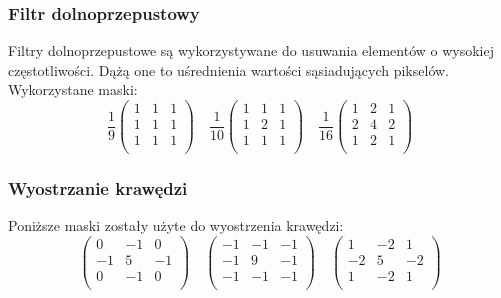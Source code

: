 \documentclass{classrep}
\begin{document}
\subsubsection{Filtr dolnoprzepustowy}
Filtry dolnoprzepustowe są wykorzystywane do usuwania elementów o wysokiej częstotliwości. Dążą one to uśrednienia wartości sąsiadujących pikselów.
Wykorzystane maski:
\[
\frac{1}{9}
 \begin{pmatrix}
  1 & 1 & 1 \\
  1 & 1 & 1 \\
  1 & 1 & 1 \\
 \end{pmatrix}
\quad
\frac{1}{10}
 \begin{pmatrix}
  1 & 1 & 1 \\
  1 & 2 & 1 \\
  1 & 1 & 1 \\
 \end{pmatrix}
\quad
\frac{1}{16}
 \begin{pmatrix}
  1 & 2 & 1 \\
  2 & 4 & 2 \\
  1 & 2 & 1 \\
 \end{pmatrix}
\]

\subsubsection{Wyostrzanie krawędzi}
Poniższe maski zostały użyte do wyostrzenia krawędzi:
\[
 \begin{pmatrix}
  0 & -1 & 0 \\
  -1 & 5 & -1 \\
  0 & -1 & 0 \\
 \end{pmatrix}
\quad
 \begin{pmatrix}
  -1 & -1 & -1 \\
  -1 & 9 & -1 \\
  -1 & -1 & -1 \\
 \end{pmatrix}
\quad
 \begin{pmatrix}
  1 & -2 & 1 \\
  -2 & 5 & -2 \\
  1 & -2 & 1 \\
 \end{pmatrix}
\]
\end{document}
